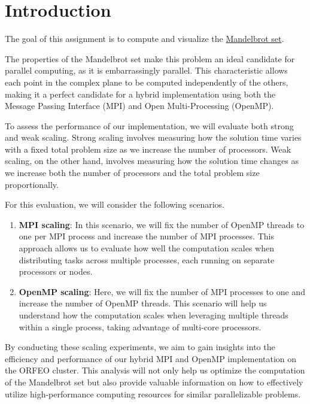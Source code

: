 \section{Introduction}

The goal of this assignment is to compute and visualize the \href{https://en.wikipedia.org/wiki/Mandelbrot_set}{Mandelbrot set}.

The properties of the Mandelbrot set make this problem an ideal candidate for parallel computing, as it is embarrassingly parallel. This characteristic allows each point in the complex plane to be computed independently of the others, making it a perfect candidate for a hybrid implementation using both the Message Passing Interface (MPI) and Open Multi-Processing (OpenMP).

To assess the performance of our implementation, we will evaluate both strong and weak scaling. Strong scaling involves measuring how the solution time varies with a fixed total problem size as we increase the number of processors. Weak scaling, on the other hand, involves measuring how the solution time changes as we increase both the number of processors and the total problem size proportionally.

For this evaluation, we will consider the following scenarios.

\begin{enumerate}
\item \textbf{MPI scaling}: In this scenario, we will fix the number of OpenMP threads to one per MPI process and increase the number of MPI processes. This approach allows us to evaluate how well the computation scales when distributing tasks across multiple processes, each running on separate processors or nodes.
\item \textbf{OpenMP scaling}: Here, we will fix the number of MPI processes to one and increase the number of OpenMP threads. This scenario will help us understand how the computation scales when leveraging multiple threads within a single process, taking advantage of multi-core processors.
\end{enumerate}

By conducting these scaling experiments, we aim to gain insights into the efficiency and performance of our hybrid MPI and OpenMP implementation on the ORFEO cluster. This analysis will not only help us optimize the computation of the Mandelbrot set but also provide valuable information on how to effectively utilize high-performance computing resources for similar parallelizable problems.

